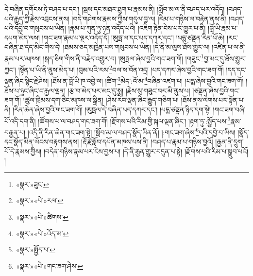 དེ་བཞིན་དགོངས་ཏེ་བཤད་པ་དང་། །སྦས་དང་མཐར་ཐུག་པ་རྣམས་ནི། །སློབ་མ་ལ་ནི་བཤད་པར་འདོད། །བཤད་པའི་རྒྱུད་ཀྱི་རྗེས་འབྲངས་ནས། །བདེ་གཤེགས་རྣམས་ཀྱིས་གདུལ་བྱ་ལ། །རིམ་པ་གཉིས་ལ་བརྟེན་ནས་ནི། །བཤད་པའི་དབྱེ་བ་གསུངས་པ་ཡིན། །རྣམ་པ་ཀུན་ཏུ་ཉན་འདོད་པའི། །འཇིག་རྟེན་ངེས་པར་གྱུར་པ་ནི། །བློ་ཡི་རྣམ་པ་དཔག་མེད་ལས། །གང་ཟག་རྣམ་པ་ལྔར་འདོད་དོ། །ཨུཏྤ་ལ་དང་པད་དཀར་དང་། །པདྨ་ཙནྡན་རིན་པོ་ཆེ། །རང་བཞིན་ཐ་དད་མིང་གིས་དེ། །ཐམས་ཅད་མཁྱེན་པས་གསུངས་པ་ཡིན། །དེ་ནི་མ་ལུས་ཐོས་གྱུར་ལ། །འཛིན་པ་ལ་ནི་རྣམ་པར་མཁས། །སྐད་ཅིག་གིས་ནི་བརྗེད་འགྱུར་བ། །ཨུཏྤལ་ཞེས་བྱའི་གང་ཟག་གོ། །གཟུང་\footnote{«སྣར་»ཟུང་}བྱ་མང་དུ་ཐོས་གྱུར་ཀྱང་། །སྟོན་པ་ཡི་ནི་ནུས་མེད་པ། །བུམ་པའི་རས་\footnote{«སྣར་»«པེ་»རལ་}བལ་ས་བོན་འདྲ། །པད་དཀར་ཞེས་བྱའི་གང་ཟག་གོ། །དད་དང་ལྡན་ཞིང་སྙིང་རྗེ་ཤེས། །ཐོས་ན་བློ་ཡི་ཁ་འབྱེ་ལ། །ཚིག་\footnote{«སྣར་»«པེ་»ཚིགས་}མེད་:འོ་མ་\footnote{«སྣར་»«པེ་»འོད་མ་}བཞིན་འཛག་པ། །པདྨ་ཞེས་བྱའི་གང་ཟག་གོ། །ཐོས་པ་ཉུང་ཞིང་ང་རྒྱལ་ལྡན། །རྩ་བ་མེད་པར་མང་དུ་སྨྲ། །རྗེས་སུ་གཟུང་བར་མི་ནུས་པ། །ཙནྡན་ཞེས་བྱའི་གང་ཟག་གོ། །ཚུལ་ཁྲིམས་དག་ཅིང་མཁས་ལ་སྒྲིན། །ཤེས་རབ་ལྡན་ཞིང་རྒྱུད་གཅིག་པ། །ཐོས་ནས་ལེགས་པར་སྟོན་པ་ནི། །རིན་ཆེན་ཞེས་བྱའི་གང་ཟག་གོ། །ཨུཏྤལ་དེ་བཞིན་པད་དཀར་དང་། །པདྨ་ཙནྡན་ཉིད་དག་སྟེ། །གང་ཟག་བཞི་པོ་འདི་དག་ནི། །ཚོགས་པ་ལ་བཤད་གང་ཟག་གོ། །རྫོགས་པའི་རིམ་གྱི་སྐལ་ལྡན་ཞིང་། །རྟག་ཏུ་:སྤྱོད་པས་\footnote{«སྣར་»སྤྱོད་པ་}རྣམ་བརྒྱན་པ། །འདི་ནི་རིན་ཆེན་གང་ཟག་སྟེ། །སློབ་མ་ལ་བཤད་སྣོད་ཡིན་ནོ། །:གང་ཟག་ཞེས་\footnote{«སྣར་»«པེ་»གང་ཟག་ཤེས་}པའི་དབྱེ་བ་ཡིས། །སྣོད་དང་སྣོད་མིན་ཡོངས་བརྟགས་ནས། །རྡོ་རྗེ་སློབ་དཔོན་མཁས་པས་ནི། །བཤད་པ་རྣམ་པ་གཉིས་བྱའོ། །རྒྱན་ནི་དྲུག་པོ་དེ་རྣམས་ཀྱིས། །བདེན་གཉིས་རྣམ་པར་ངེས་བྱས་པ། །དེ་ནི་རྒྱན་གྱུར་བདུན་པ་སྟེ། །རྫོགས་པའི་རིམ་པ་སྒྲུབ་པའོ། །
